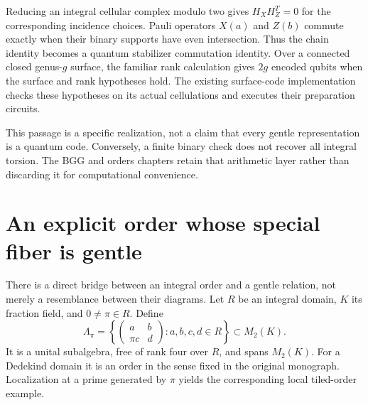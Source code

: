 Reducing an integral cellular complex modulo two gives $H_XH_Z^T=0$ for the corresponding incidence choices. Pauli operators $X(a)$ and $Z(b)$ commute exactly when their binary supports have even intersection. Thus the chain identity becomes a quantum stabilizer commutation identity. Over a connected closed genus-$g$ surface, the familiar rank calculation gives $2g$ encoded qubits when the surface and rank hypotheses hold. The existing surface-code implementation checks these hypotheses on its actual cellulations and executes their preparation circuits.

This passage is a specific realization, not a claim that every gentle representation is a quantum code. Conversely, a finite binary check does not recover all integral torsion. The BGG and orders chapters retain that arithmetic layer rather than discarding it for computational convenience.

\section{An explicit order whose special fiber is gentle}

There is a direct bridge between an integral order and a gentle relation, not merely a resemblance between their diagrams. Let $R$ be an integral domain, $K$ its fraction field, and $0\ne\pi\in R$. Define
\[
 \Lambda_\pi=\left\{\begin{pmatrix}a&b\\\pi c&d\end{pmatrix}:a,b,c,d\in R\right\}
 \subset M_2(K).
\]
It is a unital subalgebra, free of rank four over $R$, and spans $M_2(K)$. For a Dedekind domain it is an order in the sense fixed in the original monograph. Localization at a prime generated by $\pi$ yields the corresponding local tiled-order example.

